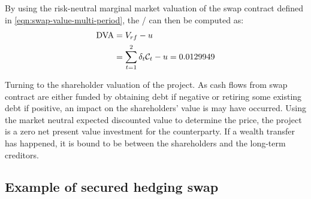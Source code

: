 \documentclass[main.tex]{subfiles}
\begin{document}
            By using the risk-neutral marginal market valuation of the swap contract
            defined in \cref{eqn:swap-value-multi-period},
            the \DVA/ can then be computed as:
            \begin{align}
                \DVA/ &= V_{rf} - u
                \\
                &= \sum_{t=1}^{2}\delta_t \mathcal{C}_t - u
                = 0.0129949
            \end{align}

            Turning to the shareholder valuation of the project.
            As cash flows from swap contract are either funded by obtaining debt if negative or retiring some existing debt if positive,
            an impact on the shareholders' value is may have occurred.
            Using the market neutral expected discounted value to determine the price, the project is a zero net present value investment for the counterparty.
            If a wealth transfer has happened, it is bound to be between the shareholders and the long-term creditors.

        \subsection{Example of secured hedging swap}
\end{document}
